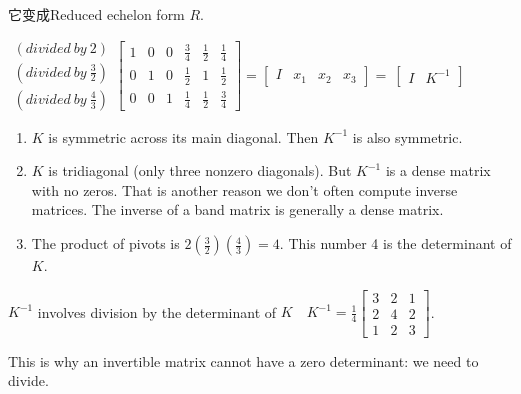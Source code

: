 \begin{example}
    它变成Reduced echelon form $R$.

    \begin{center}
        $\displaystyle \begin{matrix}
                ( divided\ by\ 2)                      \\
                \left( divided\ by\ \frac{3}{2}\right) \\
                \left( divided\ by\ \frac{4}{3}\right)
            \end{matrix}\left[\begin{matrix}
                    1 & 0 & 0 & \frac{3}{4} & \frac{1}{2} & \frac{1}{4} \\
                    0 & 1 & 0 & \frac{1}{2} & 1           & \frac{1}{2} \\
                    0 & 0 & 1 & \frac{1}{4} & \frac{1}{2} & \frac{3}{4}
                \end{matrix}\right] =\left[\begin{matrix}
                    I & x_{1} & x_{2} & x_{3}
                \end{matrix}\right] =\ \left[\begin{matrix}
                    I & K^{-1}
                \end{matrix}\right]$
    \end{center}


    \begin{enumerate}
        \item $ K $ is symmetric across its main diagonal. Then $ K^{-1} $ is also symmetric.
        \item $ K $ is tridiagonal (only three nonzero diagonals). But $ K^{-1} $ is a dense matrix with no zeros. That is another reason we don't often compute inverse matrices. The inverse of a band matrix is generally a dense matrix.
        \item The product of pivots is $ 2\left(\frac{3}{2}\right)\left(\frac{4}{3}\right)=4 $. This number 4 is the determinant of $ K $.
    \end{enumerate}

    $ K^{-1} $ involves division by the determinant of $ K \quad K^{-1}=\frac{1}{4}\left[\begin{array}{lll}3 & 2 & 1 \\ 2 & 4 & 2 \\ 1 & 2 & 3\end{array}\right] $.

    This is why an invertible matrix cannot have a zero determinant: we need to divide.

\end{example}


